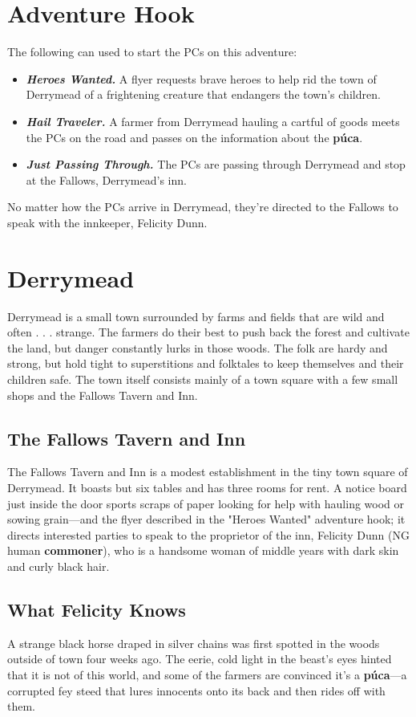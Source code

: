 \documentclass[10pt,a4paper,twoside,bg=print,twocolumn,openany,nodeprecatedcode]{dndbook}
\begin{document}
\section{Adventure Hook}
The following can used to start the PCs on this adventure:


\begin{itemize}
\item \textbf{\textit{Heroes Wanted.}} A flyer requests brave heroes to help rid the town of Derrymead of a frightening creature that endangers the town's children.
\item \textbf{\textit{Hail Traveler.}} A farmer from Derrymead hauling a cartful of goods meets the PCs on the road and passes on the information about the \textbf{púca}.
\item \textbf{\textit{Just Passing Through.}} The PCs are passing through Derrymead and stop at the Fallows, Derrymead's inn.
\end{itemize}

No matter how the PCs arrive in Derrymead, they're directed to the Fallows to speak with the innkeeper, Felicity Dunn.

\section{Derrymead}
Derrymead is a small town surrounded by farms and fields that are wild and often . . . strange. The farmers do their best to push back the forest and cultivate the land, but danger constantly lurks in those woods. The folk are hardy and strong, but hold tight to superstitions and folktales to keep themselves and their children safe. The town itself consists mainly of a town square with a few small shops and the Fallows Tavern and Inn.

\subsection{The Fallows Tavern and Inn}
The Fallows Tavern and Inn is a modest establishment in the tiny town square of Derrymead. It boasts but six tables and has three rooms for rent. A notice board just inside the door sports scraps of paper looking for help with hauling wood or sowing grain—and the flyer described in the "Heroes Wanted" adventure hook; it directs interested parties to speak to the proprietor of the inn, Felicity Dunn (NG human \textbf{commoner}), who is a handsome woman of middle years with dark skin and curly black hair.

\subsection{What Felicity Knows}
A strange black horse draped in silver chains was first spotted in the woods outside of town four weeks ago. The eerie, cold light in the beast's eyes hinted that it is not of this world, and some of the farmers are convinced it's a \textbf{púca}—a corrupted fey steed that lures innocents onto its back and then rides off with them.
\end{document}
